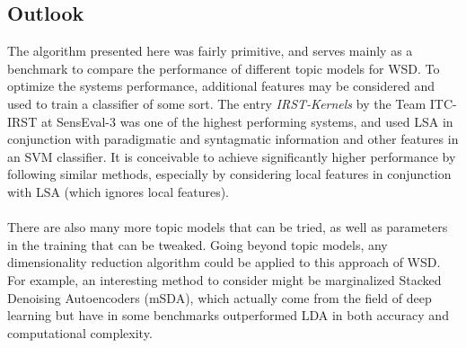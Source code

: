 \subsection{Outlook}
The algorithm presented here was fairly primitive, and serves mainly as a benchmark to compare the performance of different topic models for WSD. To optimize the systems performance, additional features may be considered and used to train a classifier of some sort. The entry \textit{IRST-Kernels} by the Team ITC-IRST at SensEval-3 was one of the highest performing systems, and used LSA in conjunction with paradigmatic and syntagmatic information and other features in an SVM classifier\cite{senseval3paper}. It is conceivable to achieve significantly higher performance by following similar methods, especially by considering local features in conjunction with LSA (which ignores local features).\\\\
There are also many more topic models that can be tried, as well as parameters in the training that can be tweaked. Going beyond topic models, any dimensionality reduction algorithm could be applied to this approach of WSD. For example, an interesting method to consider might be marginalized Stacked Denoising Autoencoders (mSDA), which actually come from the field of deep learning but have in some benchmarks outperformed LDA in both accuracy and computational complexity.



